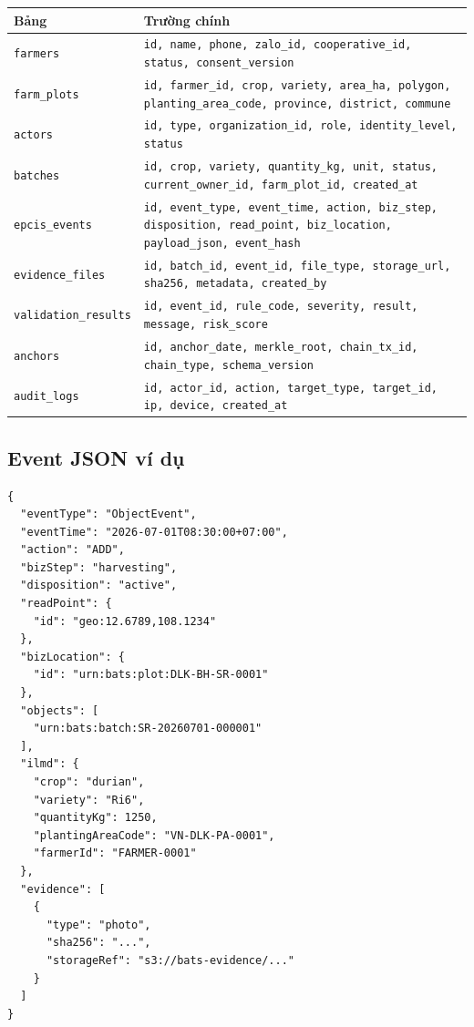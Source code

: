 \documentclass[12pt,a4paper]{article}
\begin{document}
\begin{longtable}{p{4cm}p{9.5cm}}
\toprule
\textbf{Bảng} & \textbf{Trường chính} \\
\midrule
\endhead
\texttt{farmers} & \texttt{id, name, phone, zalo\_id, cooperative\_id, status, consent\_version} \\
\addlinespace
\texttt{farm\_plots} & \texttt{id, farmer\_id, crop, variety, area\_ha, polygon, planting\_area\_code, province, district, commune} \\
\addlinespace
\texttt{actors} & \texttt{id, type, organization\_id, role, identity\_level, status} \\
\addlinespace
\texttt{batches} & \texttt{id, crop, variety, quantity\_kg, unit, status, current\_owner\_id, farm\_plot\_id, created\_at} \\
\addlinespace
\texttt{epcis\_events} & \texttt{id, event\_type, event\_time, action, biz\_step, disposition, read\_point, biz\_location, payload\_json, event\_hash} \\
\addlinespace
\texttt{evidence\_files} & \texttt{id, batch\_id, event\_id, file\_type, storage\_url, sha256, metadata, created\_by} \\
\addlinespace
\texttt{validation\_results} & \texttt{id, event\_id, rule\_code, severity, result, message, risk\_score} \\
\addlinespace
\texttt{anchors} & \texttt{id, anchor\_date, merkle\_root, chain\_tx\_id, chain\_type, schema\_version} \\
\addlinespace
\texttt{audit\_logs} & \texttt{id, actor\_id, action, target\_type, target\_id, ip, device, created\_at} \\
\bottomrule
\end{longtable}

\subsection{Event JSON ví dụ}

\begin{lstlisting}[basicstyle=\ttfamily\small,breaklines=true]
{
  "eventType": "ObjectEvent",
  "eventTime": "2026-07-01T08:30:00+07:00",
  "action": "ADD",
  "bizStep": "harvesting",
  "disposition": "active",
  "readPoint": {
    "id": "geo:12.6789,108.1234"
  },
  "bizLocation": {
    "id": "urn:bats:plot:DLK-BH-SR-0001"
  },
  "objects": [
    "urn:bats:batch:SR-20260701-000001"
  ],
  "ilmd": {
    "crop": "durian",
    "variety": "Ri6",
    "quantityKg": 1250,
    "plantingAreaCode": "VN-DLK-PA-0001",
    "farmerId": "FARMER-0001"
  },
  "evidence": [
    {
      "type": "photo",
      "sha256": "...",
      "storageRef": "s3://bats-evidence/..."
    }
  ]
}
\end{lstlisting}
\end{document}
